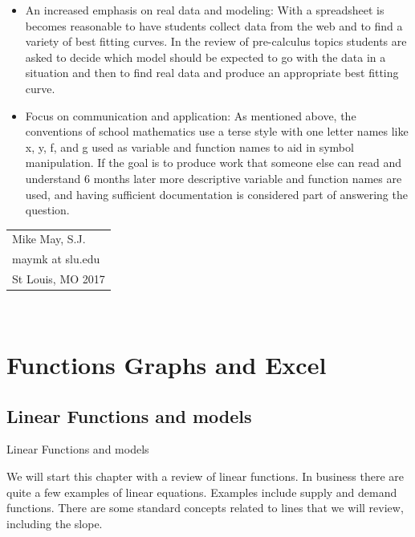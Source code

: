 \documentclass[10pt,]{book}
\theoremstyle{plain}
\theoremstyle{definition}
\theoremstyle{definition}
\begin{document}
\begin{itemize}[label=\textbullet]
%
\item{} An increased emphasis on real data and modeling: With a spreadsheet is becomes reasonable to have students collect data from the web and to find a variety of best fitting curves. In the review of pre-calculus topics students are asked to decide which model should be expected to go with the data in a situation and then to find real data and produce an appropriate best fitting curve. 
%
\item{} Focus on communication and application: As mentioned above, the conventions of school mathematics use a terse style with one letter names like x, y, f, and g used as variable and function names to aid in symbol manipulation. If the goal is to produce work that someone else can read and understand 6 months later more descriptive variable and function names are used, and having sufficient documentation is considered part of answering the question. %
\end{itemize}
\par\hfill\begin{tabular}{l@{}}
Mike May, S.J.\\
maymk at slu.edu\\
St Louis, MO 2017
\end{tabular}\\\par
\setcounter{tocdepth}{1}
\renewcommand*\contentsname{Contents}
\tableofcontents
\mainmatter
\typeout{************************************************}
\typeout{************************************************}
\chapter[{Functions Graphs and Excel}]{Functions Graphs and Excel}\label{chap-1-FunctionsGraphsExcel}
\typeout{************************************************}
\typeout{************************************************}
\section[{Linear Functions and models}]{Linear Functions and models}\label{sec-1-1-LinearFunctionsAndModels}
Linear Functions and models%
\par
We will start this chapter with a review of linear functions. In business there are quite a few examples of linear equations. Examples include supply and demand functions. There are some standard concepts related to lines that we will review, including the slope. %
\par
\end{document}
